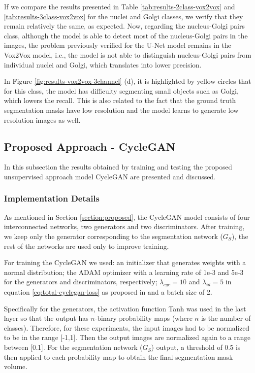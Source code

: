 If we compare the results presented in Table \ref{tab:results-2class-vox2vox} and \ref{tab:results-3class-vox2vox} for the nuclei and Golgi classes, we verify that they remain relatively the same, as expected. Now, regarding the nucleus-Golgi pairs class, although the model is able to detect most of the nucleus-Golgi pairs in the images, the problem previously verified for the U-Net model remains in the Vox2Vox model, i.e., the model is not able to distinguish nucleus-Golgi pairs from individual nuclei and Golgi, which translates into lower precision. 

In Figure \ref{fig:results-vox2vox-3channel} (d), it is highlighted by yellow circles that for this class, the model has difficulty segmenting small objects such as Golgi, which lowers the recall. This is also related to the fact that the ground truth segmentation masks have low resolution and the model learns to generate low resolution images as well.


\subsection{Proposed Approach - CycleGAN}

In this subsection the results obtained by training and testing the proposed unsupervised approach model CycleGAN are presented and discussed.

\subsubsection*{Implementation Details}

As mentioned in Section \ref{section:proposed}, the CycleGAN model consists of four interconnected networks, two generators and two discriminators. After training, we keep only the generator corresponding to the segmentation network ($G_S$), the rest of the networks are used only to improve training. 

For training the CycleGAN we used: an initializer that generates weights with a normal distribution; the ADAM optimizer with a learning rate of 1e-3 and 5e-3 for the generators and discriminators, respectively; $\lambda_{cyc} = 10$ and $\lambda_{id} = 5$ in equation \ref{eq:total-cyclegan-loss} as proposed in \cite{cycleGAN:original} and a batch size of 2.

Specifically for the generators, the activation function \ac{Tanh} was used in the last layer so that the output has $n$-binary probability maps (where $n$ is the number of classes). Therefore, for these experiments, the input images had to be normalized to be in the range [-1,1]. Then the output images are normalized again to a range between [0.1]. For the segmentation network ($G_S$) output, a threshold of 0.5 is then applied to each probability map to obtain the final segmentation mask volume.

